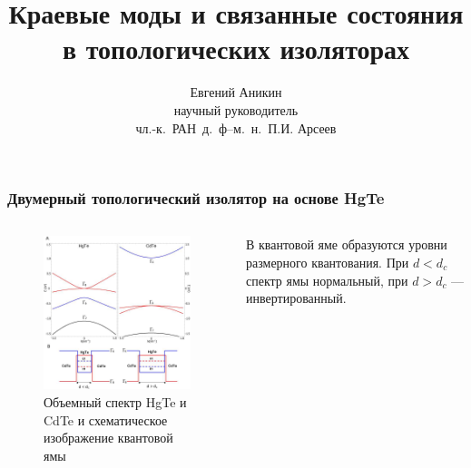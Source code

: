 \documentclass{beamer}
\title{Краевые моды и связанные состояния в топологических изоляторах}
\author[Е. Аникин]{Евгений Аникин \\
	научный руководитель\\
	чл.-к.~РАН~д.~ф--м.~н.~П.И. Арсеев}
\institute{ФИАН им. Лебедева}
\date{}
\begin{document}
\begin{frame}
    \titlepage
\end{frame}

\begin{frame}
    \frametitle{Двумерный топологический изолятор на основе HgTe}
    \begin{columns}[T]
        \begin{column}{0.5\textwidth}
            \begin{figure}[h]
                \includegraphics[width=0.95\linewidth]{quantum_well.png}
                \caption{Объемный спектр HgTe и CdTe и 
                         схематическое изображение квантовой ямы}
            \end{figure}
        \end{column}
        \begin{column}{0.5\textwidth}
            В квантовой яме образуются уровни размерного квантования. При
            $d < d_c$ спектр ямы нормальный, при $d > d_c$ --- 
            инвертированный.
        \end{column}
    \end{columns}
\end{frame}
\end{document}
